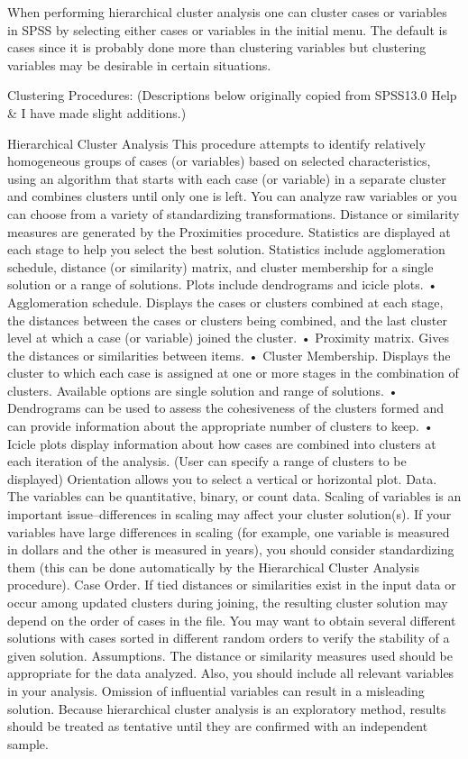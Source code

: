When performing hierarchical cluster analysis one can cluster cases or variables in SPSS by selecting either cases or variables in the initial menu.  The default is cases since it is probably done more than clustering variables but clustering variables may be desirable in certain situations.  

 
Clustering Procedures: 
(Descriptions below originally copied from SPSS13.0 Help & I have made slight additions.)

Hierarchical Cluster Analysis 
This procedure attempts to identify relatively homogeneous groups of cases (or variables) based on selected characteristics, using an algorithm that starts with each case (or variable) in a separate cluster and combines clusters until only one is left. You can analyze raw variables or you can choose from a variety of standardizing transformations. Distance or similarity measures are generated by the Proximities procedure. Statistics are displayed at each stage to help you select the best solution.  Statistics include agglomeration schedule, distance (or similarity) matrix, and cluster membership for a single solution or a range of solutions.  Plots include dendrograms and icicle plots.
•	Agglomeration schedule. Displays the cases or clusters combined at each stage, the distances between the cases or clusters being combined, and the last cluster level at which a case (or variable) joined the cluster.
•	Proximity matrix. Gives the distances or similarities between items.
•	Cluster Membership. Displays the cluster to which each case is assigned at one or more stages in the combination of clusters. Available options are single solution and range of solutions.
•	Dendrograms can be used to assess the cohesiveness of the clusters formed and can provide information about the appropriate number of clusters to keep.
•	Icicle plots display information about how cases are combined into clusters at each iteration of the analysis. (User can specify a range of clusters to be displayed) Orientation allows you to select a vertical or horizontal plot.
Data.  The variables can be quantitative, binary, or count data. Scaling of variables is an important issue--differences in scaling may affect your cluster solution(s). If your variables have large differences in scaling (for example, one variable is measured in dollars and the other is measured in years), you should consider standardizing them (this can be done automatically by the Hierarchical Cluster Analysis procedure).
Case Order.  If tied distances or similarities exist in the input data or occur among updated clusters during joining, the resulting cluster solution may depend on the order of cases in the file. You may want to obtain several different solutions with cases sorted in different random orders to verify the stability of a given solution.
Assumptions.  The distance or similarity measures used should be appropriate for the data analyzed. Also, you should include all relevant variables in your analysis. Omission of influential variables can result in a misleading solution. Because hierarchical cluster analysis is an exploratory method, results should be treated as tentative until they are confirmed with an independent sample.

